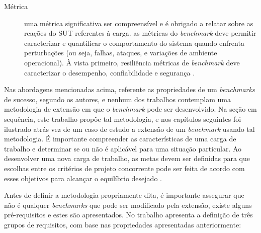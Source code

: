 \begin{description}
	\item[Métrica] uma métrica significativa ser compreensível e é obrigado a relatar sobre as reações do SUT referentes à carga.  as métricas do \textit{benchmark} deve permitir caracterizar e quantificar o comportamento do sistema quando enfrenta perturbações (ou seja, falhas, ataques, e variações de ambiente operacional). À vista primeiro, resiliência métricas de \textit{benchmark} deve caracterizar o desempenho, confiabilidade e segurança \cite{Marco2012}.
	
\end{description}

Nas abordagens mencionadas acima, referente as propriedades de um \textit{benchmarks} de sucesso, segundo os autores, e nenhum dos trabalhos contemplam uma metodologia de extensão em que o \textit{benchmark} pode ser desenvolvido. Na seção em sequência, este trabalho propõe tal metodologia, e nos capítulos seguintes foi ilustrado atrás vez de um caso de estudo a extensão de um \textit{benchmark} usando tal metodologia. É importante compreender as características de uma carga de trabalho e determinar se ou não é aplicável para uma situação particular. Ao desenvolver uma nova carga de trabalho, as metas devem ser definidas para que escolhas entre os critérios de projeto concorrente pode ser feita de acordo com esses objetivos para alcançar o equilíbrio desejado \cite{Kistowski2015}.

Antes de definir a metodologia propriamente dita, é importante assegurar que não é qualquer \textit{benchmarks} que pode ser modificado pela extensão, existe alguns pré-requisitos e estes são apresentados. No trabalho  apresenta a definição de três grupos de requisitos, com base nas propriedades apresentadas anteriormente:

